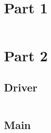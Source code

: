 \documentclass{article}
\begin{document}
\section{Part 1}
\inputminted{C}{polled_uart_part1.c}
\newpage
\section{Part 2}
\subsection{Driver}
\inputminted{C}{uart_driver.h}
\newpage
\subsection{Main}
\inputminted{C}{uart_interrupt.c}
\end{document}
